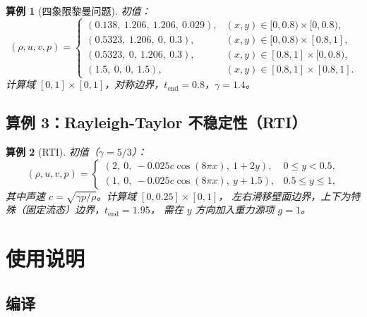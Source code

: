 \documentclass{article}
\newtheorem{example}{算例}
\numberwithin{equation}{section}
\begin{document}
\begin{example}[四象限黎曼问题]\label{ex:riemann2}
初值\cite{luo2021}：
\begin{equation}
    (\rho, u, v, p) = \begin{cases}
        (0.138,\ 1.206,\ 1.206,\ 0.029), & (x,y) \in [0,0.8)\times[0,0.8), \\
        (0.5323,\ 1.206,\ 0,\ 0.3),      & (x,y) \in [0,0.8)\times[0.8,1], \\
        (0.5323,\ 0,\ 1.206,\ 0.3),      & (x,y) \in [0.8,1]\times[0,0.8), \\
        (1.5,\ 0,\ 0,\ 1.5),             & (x,y) \in [0.8,1]\times[0.8,1].
    \end{cases}
\end{equation}
计算域 $[0,1]\times[0,1]$，对称边界，$t_{\text{end}} = 0.8$，$\gamma = 1.4$。
\end{example}

\subsection{算例 3：Rayleigh-Taylor 不稳定性（RTI）}

\begin{example}[RTI]\label{ex:rti}
初值\cite{fleischmann2019}（$\gamma = 5/3$）：
\begin{equation}
    (\rho, u, v, p) = \begin{cases}
        (2,\ 0,\ -0.025 c \cos(8\pi x),\ 1+2y),   & 0 \leq y < 0.5, \\
        (1,\ 0,\ -0.025 c \cos(8\pi x),\ y + 1.5), & 0.5 \leq y \leq 1,
    \end{cases}
\end{equation}
其中声速 $c = \sqrt{\gamma p / \rho}$。计算域 $[0,0.25]\times[0,1]$，
左右滑移壁面边界，上下为特殊（固定流态）边界，$t_{\text{end}} = 1.95$，
需在 $y$ 方向加入重力源项 $g = 1$。
\end{example}

\section{使用说明}

\subsection{编译}
\end{document}
